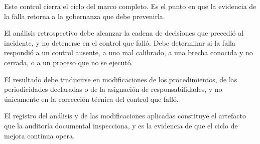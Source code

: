 Este control cierra el ciclo del marco completo. Es el punto en que la evidencia de la falla retorna a la gobernanza que debe prevenirla.

El análisis retrospectivo debe alcanzar la cadena de decisiones que precedió al incidente, y no detenerse en el control que falló. Debe determinar si la falla respondió a un control ausente, a uno mal calibrado, a una brecha conocida y no cerrada, o a un proceso que no se ejecutó.

El resultado debe traducirse en modificaciones de los procedimientos, de las periodicidades declaradas o de la asignación de responsabilidades, y no únicamente en la corrección técnica del control que falló.

El registro del análisis y de las modificaciones aplicadas constituye el artefacto que la auditoría documental inspecciona, y es la evidencia de que el ciclo de mejora continua opera.

